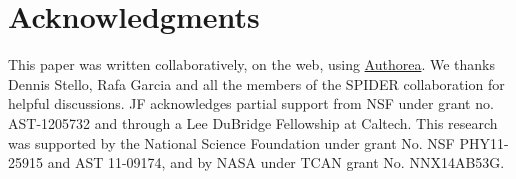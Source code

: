 \section*{Acknowledgments} 

This paper was written collaboratively, on the web, using \href{https://www.authorea.com}{Authorea}. We thanks Dennis Stello, Rafa Garcia and all the members of the SPIDER collaboration for helpful discussions. JF acknowledges partial support from NSF under grant no. AST-1205732 and through a Lee DuBridge Fellowship at Caltech. This research was supported by the National Science Foundation under grant No. NSF PHY11- 25915 and AST 11-09174, and by NASA under TCAN grant No. NNX14AB53G.

